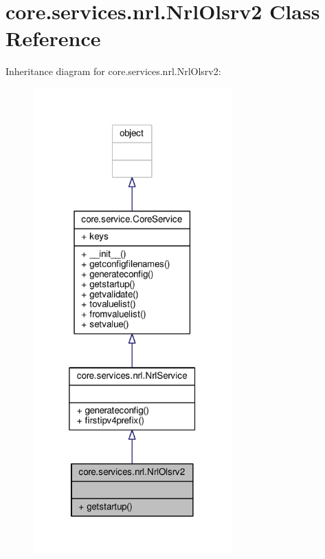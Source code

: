 \hypertarget{classcore_1_1services_1_1nrl_1_1_nrl_olsrv2}{\section{core.\+services.\+nrl.\+Nrl\+Olsrv2 Class Reference}
\label{classcore_1_1services_1_1nrl_1_1_nrl_olsrv2}
}


Inheritance diagram for core.\+services.\+nrl.\+Nrl\+Olsrv2\+:
\nopagebreak
\begin{figure}[H]
\begin{center}
\leavevmode
\includegraphics[width=217pt]{classcore_1_1services_1_1nrl_1_1_nrl_olsrv2__inherit__graph}
\end{center}
\end{figure}



